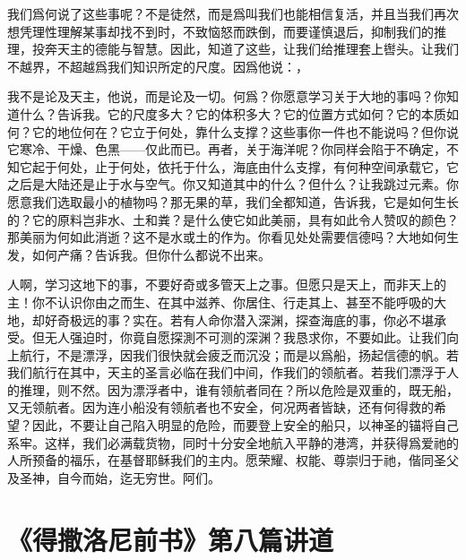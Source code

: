 我们爲何说了这些事呢？不是徒然，而是爲叫我们也能相信复活，并且当我们再次想凭理性理解某事却找不到时，不致恼怒而跌倒，而要谨慎退后，抑制我们的推理，投奔天主的德能与智慧。因此，知道了这些，让我们给推理套上辔头。让我们不越界，不超越爲我们知识所定的尺度。因爲他说：，\par

我不是论及天主，他说，而是论及一切。何爲？你愿意学习关于大地的事吗？你知道什么？告诉我。它的尺度多大？它的体积多大？它的位置方式如何？它的本质如何？它的地位何在？它立于何处，靠什么支撑？这些事你一件也不能说吗？但你说它寒冷、干燥、色黑——仅此而已。再者，关于海洋呢？你同样会陷于不确定，不知它起于何处，止于何处，依托于什么，海底由什么支撑，有何种空间承载它，它之后是大陆还是止于水与空气。你又知道其中的什么？但什么？让我跳过元素。你愿意我们选取最小的植物吗？那无果的草，我们全都知道，告诉我，它是如何生长的？它的原料岂非水、土和粪？是什么使它如此美丽，具有如此令人赞叹的颜色？那美丽为何如此消逝？这不是水或土的作为。你看见处处需要信德吗？大地如何生发，如何产痛？告诉我。但你什么都说不出来。\par

人啊，学习这地下的事，不要好奇或多管天上之事。但愿只是天上，而非天上的主！你不认识你由之而生、在其中滋养、你居住、行走其上、甚至不能呼吸的大地，却好奇极远的事？实在。若有人命你潜入深渊，探查海底的事，你必不堪承受。但无人强迫时，你竟自愿探測不可测的深渊？我恳求你，不要如此。让我们向上航行，不是漂浮，因我们很快就会疲乏而沉没；而是以爲船，扬起信德的帆。若我们航行在其中，天主的圣言必临在我们中间，作我们的领航者。若我们漂浮于人的推理，则不然。因为漂浮者中，谁有领航者同在？所以危险是双重的，既无船，又无领航者。因为连小船没有领航者也不安全，何况两者皆缺，还有何得救的希望？因此，不要让自己陷入明显的危险，而要登上安全的船只，以神圣的锚将自己系牢。这样，我们必满载货物，同时十分安全地航入平静的港湾，并获得爲爱祂的人所预备的福乐，在基督耶稣我们的主内。愿荣耀、权能、尊崇归于祂，偕同圣父及圣神，自今而始，迄无穷世。阿们。\par



\section{《得撒洛尼前书》第八篇讲道}

